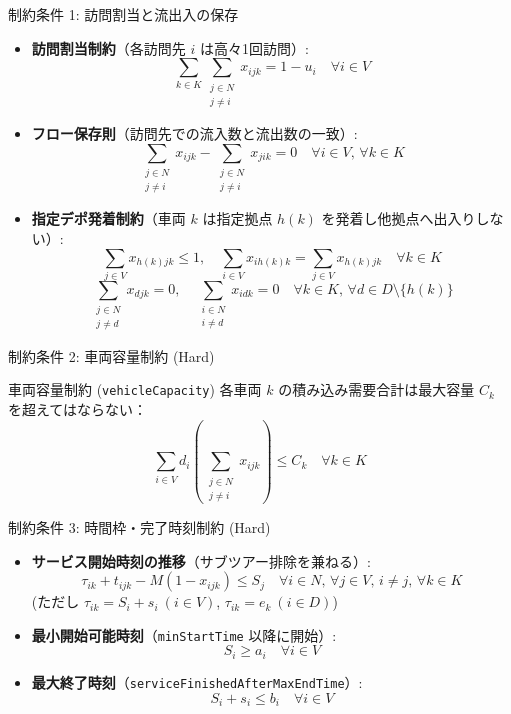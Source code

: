 \documentclass[aspectratio=169,11pt]{beamer}
\begin{document}
\begin{frame}{制約条件 1: 訪問割当と流出入の保存}
  \small
  \begin{itemize}
    \item \textbf{訪問割当制約}（各訪問先 $i$ は高々1回訪問）:
      \[ \sum_{k \in K} \sum_{\substack{j \in N \\ j \neq i}} x_{ijk} = 1 - u_i \quad \forall i \in V \]
    \item \textbf{フロー保存則}（訪問先での流入数と流出数の一致）:
      \[ \sum_{\substack{j \in N \\ j \neq i}} x_{ijk} - \sum_{\substack{j \in N \\ j \neq i}} x_{jik} = 0 \quad \forall i \in V, \, \forall k \in K \]
    \item \textbf{指定デポ発着制約}（車両 $k$ は指定拠点 $h(k)$ を発着し他拠点へ出入りしない）:
      \[ \sum_{j \in V} x_{h(k) j k} \le 1, \quad \sum_{i \in V} x_{i h(k) k} = \sum_{j \in V} x_{h(k) j k} \quad \forall k \in K \]
      \[ \sum_{\substack{j \in N \\ j \neq d}} x_{d j k} = 0, \quad \sum_{\substack{i \in N \\ i \neq d}} x_{i d k} = 0 \quad \forall k \in K, \, \forall d \in D \setminus \{h(k)\} \]
  \end{itemize}
\end{frame}

\begin{frame}{制約条件 2: 車両容量制約 (Hard)}
  \begin{block}{車両容量制約 (\texttt{vehicleCapacity})}
    各車両 $k$ の積み込み需要合計は最大容量 $C_k$ を超えてはならない：
    \[
      \sum_{i \in V} d_i \left( \sum_{\substack{j \in N \\ j \neq i}} x_{ijk} \right) \le C_k \quad \forall k \in K
    \]
  \end{block}
\end{frame}

\begin{frame}{制約条件 3: 時間枠・完了時刻制約 (Hard)}
  \small
  \begin{itemize}
    \item \textbf{サービス開始時刻の推移}（サブツアー排除を兼ねる）:
      \[ \tau_{ik} + t_{ijk} - M (1 - x_{ijk}) \le S_j \quad \forall i \in N, \, \forall j \in V, \, i \neq j, \, \forall k \in K \]
      \quad (ただし $\tau_{ik} = S_i + s_i \ (i \in V)$, $\tau_{ik} = e_k \ (i \in D)$)
    \item \textbf{最小開始可能時刻}（\texttt{minStartTime} 以降に開始）:
      \[ S_i \ge a_i \quad \forall i \in V \]
    \item \textbf{最大終了時刻}（\texttt{serviceFinishedAfterMaxEndTime}）:
      \[ S_i + s_i \le b_i \quad \forall i \in V \]
  \end{itemize}
\end{frame}
\end{document}
